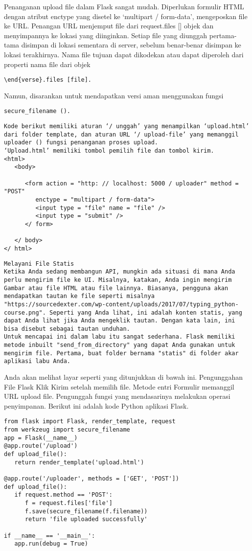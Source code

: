 \documentclass[12pt,a4paper]{article}
\begin{document}
Penanganan upload file dalam Flask sangat mudah. Diperlukan formulir HTML dengan atribut enctype yang disetel ke ‘multipart / form-data’, mengeposkan file ke URL. Penangan URL menjemput file dari request.files [] objek dan menyimpannya ke lokasi yang diinginkan. Setiap file yang diunggah pertama-tama disimpan di lokasi sementara di server, sebelum benar-benar disimpan ke lokasi terakhirnya. Nama file tujuan dapat dikodekan atau dapat diperoleh dari properti nama file dari objek 
\begin{verbatim}
\end{verse}.files [file]. 
\end{verbatim}
Namun, disarankan untuk mendapatkan versi aman menggunakan fungsi 
\begin{verbatim}
secure_filename ().
\end{verbatim}
\begin{verbatim}
Kode berikut memiliki aturan ‘/ unggah’ yang menampilkan ‘upload.html’ dari folder template, dan aturan URL ‘/ upload-file’ yang memanggil uploader () fungsi penanganan proses upload.
‘Upload.html’ memiliki tombol pemilih file dan tombol kirim.
<html>
   <body>
   
      <form action = "http: // localhost: 5000 / uploader" method = "POST"
         enctype = "multipart / form-data">
         <input type = "file" name = "file" />
         <input type = "submit" />
      </ form>
      
   </ body>
</ html>
\end{verbatim}
\begin{verbatim}
Melayani File Statis
Ketika Anda sedang membangun API, mungkin ada situasi di mana Anda perlu mengirim file ke UI. Misalnya, katakan, Anda ingin mengirim Gambar atau file HTML atau file lainnya. Biasanya, pengguna akan mendapatkan tautan ke file seperti misalnya "https://sourcedexter.com/wp-content/uploads/2017/07/typing_python-course.png". Seperti yang Anda lihat, ini adalah konten statis, yang dapat Anda lihat jika Anda mengeklik tautan. Dengan kata lain, ini bisa disebut sebagai tautan unduhan.
Untuk mencapai ini dalam labu itu sangat sederhana. Flask memiliki metode inbuilt "send_from_directory" yang dapat Anda gunakan untuk mengirim file. Pertama, buat folder bernama "statis" di folder akar aplikasi labu Anda.
\end{verbatim}
Anda akan melihat layar seperti yang ditunjukkan di bawah ini. Pengunggahan File Flask Klik Kirim setelah memilih file. Metode entri Formulir memanggil URL upload file. Pengunggah fungsi yang mendasarinya melakukan operasi penyimpanan.
Berikut ini adalah kode Python aplikasi Flask.
\begin{verbatim}
from flask import Flask, render_template, request
from werkzeug import secure_filename
app = Flask(__name__)
@app.route('/upload')
def upload_file():
   return render_template('upload.html')
	
@app.route('/uploader', methods = ['GET', 'POST'])
def upload_file():
   if request.method == 'POST':
      f = request.files['file']
      f.save(secure_filename(f.filename))
      return 'file uploaded successfully'
		
if __name__ == '__main__':
   app.run(debug = True)
\end{verbatim}
\end{document}
